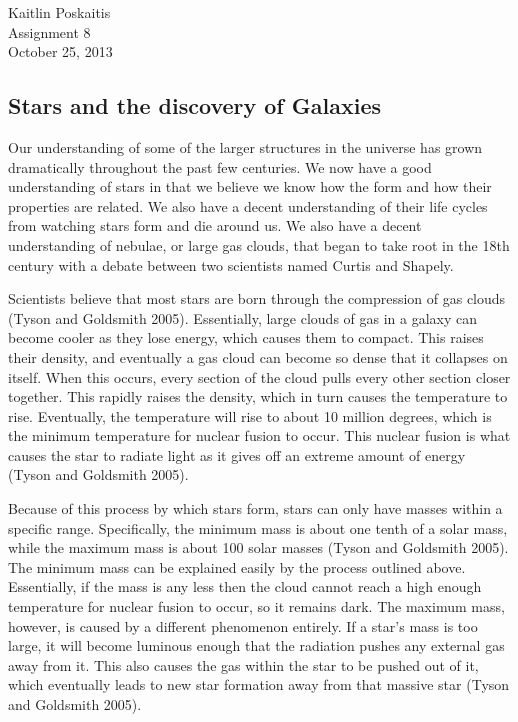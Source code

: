 \documentclass[12pt]{article}
\begin{document}
\noindent Kaitlin Poskaitis\\
Assignment 8\\
October 25, 2013
\begin{center}
    \section*{\bf Stars and the discovery of Galaxies}
\end{center}

Our understanding of some of the larger structures in the universe has grown
dramatically throughout the past few centuries.  We now have a good understanding
of stars in that we believe we know how the form and how their properties are
related.  We also have a decent understanding of their life cycles from watching
stars form and die around us.  We also have a decent understanding of nebulae,
or large gas clouds, that began to take root in the 18th century with a debate
between two scientists named Curtis and Shapely.

Scientists believe that most stars are born through the compression of gas
clouds (Tyson and Goldsmith 2005).  Essentially, large clouds of gas in a galaxy
can become cooler as they
lose energy, which causes them to compact.  This raises their density, and
eventually a gas cloud can become so dense that it collapses on itself.  When
this occurs, every section of the cloud pulls every other section closer
together.  This rapidly raises the density, which in turn causes the temperature
to rise.  Eventually, the temperature will rise to about 10 million degrees,
which is the minimum temperature for nuclear fusion to occur.  This nuclear
fusion is what causes the star to radiate light as it gives off an extreme
amount of energy (Tyson and Goldsmith 2005).

Because of this process by which stars form, stars can only have masses within a
specific range.  Specifically, the minimum mass is about one tenth of a solar
mass, while the maximum mass is about 100 solar masses (Tyson and Goldsmith
2005).  The minimum mass can be
explained easily by the process outlined above.  Essentially, if the mass is any
less then the cloud cannot reach a high enough temperature for nuclear fusion to
occur, so it remains dark.  The maximum mass, however, is caused by a different
phenomenon entirely.  If a star's mass is too large, it will become luminous
enough that the radiation pushes any external gas away from it.  This also
causes the gas within the star to be pushed out of it, which eventually leads to
new star formation away from that massive star (Tyson and Goldsmith 2005).
\end{document}
